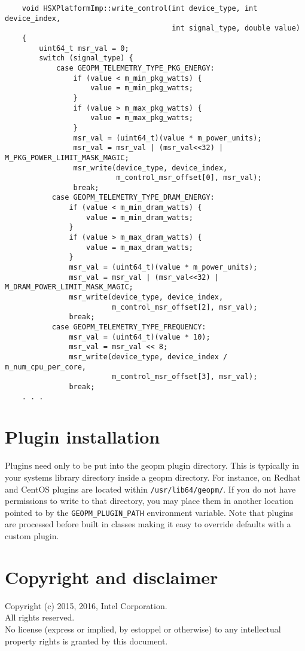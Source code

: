 \documentclass[11pt]{article}
\begin{document}
\begin{verbatim}
    void HSXPlatformImp::write_control(int device_type, int device_index,
                                       int signal_type, double value)
    {
        uint64_t msr_val = 0;
        switch (signal_type) {
            case GEOPM_TELEMETRY_TYPE_PKG_ENERGY:
                if (value < m_min_pkg_watts) {
                    value = m_min_pkg_watts;
                }
                if (value > m_max_pkg_watts) {
                    value = m_max_pkg_watts;
                }
                msr_val = (uint64_t)(value * m_power_units);
                msr_val = msr_val | (msr_val<<32) | M_PKG_POWER_LIMIT_MASK_MAGIC;
                msr_write(device_type, device_index,
                          m_control_msr_offset[0], msr_val);
                break;
           case GEOPM_TELEMETRY_TYPE_DRAM_ENERGY:
               if (value < m_min_dram_watts) {
                   value = m_min_dram_watts;
               }
               if (value > m_max_dram_watts) {
                   value = m_max_dram_watts;
               }
               msr_val = (uint64_t)(value * m_power_units);
               msr_val = msr_val | (msr_val<<32) | M_DRAM_POWER_LIMIT_MASK_MAGIC;
               msr_write(device_type, device_index,
                         m_control_msr_offset[2], msr_val);
               break;
           case GEOPM_TELEMETRY_TYPE_FREQUENCY:
               msr_val = (uint64_t)(value * 10);
               msr_val = msr_val << 8;
               msr_write(device_type, device_index / m_num_cpu_per_core,
                         m_control_msr_offset[3], msr_val);
               break;
    . . .
\end{verbatim}

\section{Plugin installation}
Plugins need only to be put into the geopm plugin directory. This is
typically in your systems library directory inside a geopm
directory. For instance, on Redhat and CentOS plugins are located
within \verb#/usr/lib64/geopm/#. If you do not have permissions to
write to that directory, you may place them in another location
pointed to by the \verb#GEOPM_PLUGIN_PATH# environment variable.  Note
that plugins are processed before built in classes making it easy to
override defaults with a custom plugin.

\section{Copyright and disclaimer}
Copyright (c) 2015, 2016, Intel Corporation.
\\
All rights reserved.
\\
No license (express or implied, by estoppel or otherwise) to any
intellectual property rights is granted by this document.

%
%
%
\end{document}
